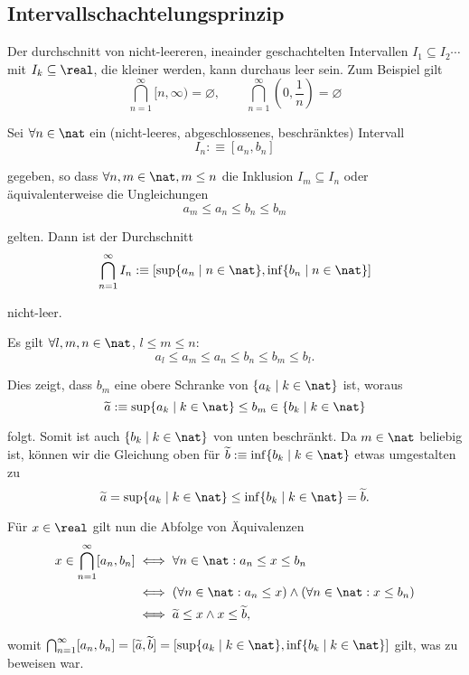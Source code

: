 \subsection{Intervallschachtelungsprinzip}

Der durchschnitt von nicht-leereren, ineainder geschachtelten Intervallen $I_1 \subseteq I_2 \cdots $ mit $I_k \subseteq \real$, die kleiner werden, kann durchaus leer sein. Zum Beispiel gilt
\[
  \bigcap_{n=1}^{\infty} [n, \infty) = \varnothing,
  \qquad
  \bigcap_{n=1}^{\infty} \left(0, \frac{1}{n}\right) = \varnothing
\]

\begin{thm}[Intervallschachtelungsprinzip]
  \label{thm: Intervallschachtelungsprinzip}
  Sei $\forall n \in \nat$ ein (nicht-leeres, abgeschlossenes, beschränktes) Intervall
  \[
    I_n :\equiv [a_n, b_n]
  \]

  gegeben, so dass $\forall n,m \in \nat, m \leq n$ die Inklusion $I_m \subseteq I_n$ oder äquivalenterweise die Ungleichungen
  \[
  a_m \leq a_n \leq b_n \leq b_m
  \]

  gelten.
  Dann ist der Durchschnitt
  \[
    \bigcap_{n=1}^{\infty}I_n :\equiv \left[ \sup\{ a_n \mid n \in \nat \}, \inf \{ b_n \mid n \in \nat \}\right]
  \]

  nicht-leer.
\end{thm}
\begin{prf}
  Es gilt $\forall l,m,n \in \nat$, $l \leq m \leq n$:
  \[
    a_l \leq a_m \leq a_n \leq b_n \leq b_m \leq b_l.
  \]

  Dies zeigt, dass $b_m$ eine obere Schranke von $\{a_k \mid k \in \nat \}$ ist, woraus
  \[
    \widetilde{a} :\equiv \sup \{ a_k \mid k \in \nat \} \leq b_m \in \{ b_k \mid k \in \nat \}
  \]

  folgt. Somit ist auch $\{ b_k \mid k \in \nat \}$ von unten beschränkt. Da $m \in \nat$ beliebig ist, können wir die Gleichung oben für $\widetilde{b} :\equiv \inf \{ b_k \mid k \in \nat \}$ etwas umgestalten zu
  \[
  \widetilde{a} = \sup \{ a_k \mid k \in \nat \} \leq \inf \{ b_k \mid k \in \nat \} = \widetilde{b}.
  \]

  Für $x \in \real$ gilt nun die Abfolge von Äquivalenzen
  \[
  \begin{aligned}
    x \in \bigcap_{n=1}^{\infty}[a_n, b_n]
    & \iff \forall n \in \nat: a_n \leq x \leq b_n \\
    & \iff (\forall n \in \nat: a_n \leq x) \wedge (\forall n \in \nat: x \leq b_n) \\
    & \iff \widetilde{a} \leq x \wedge x \leq \widetilde{b},
  \end{aligned}
  \]

  womit $\bigcap_{n=1}^{\infty}[a_n, b_n]=[\widetilde{a}, \widetilde{b}]=\left[ \sup\{ a_k \mid k \in \nat \}, \inf \{ b_k \mid k \in \nat \}\right]$ gilt, was zu beweisen war.
\end{prf}

